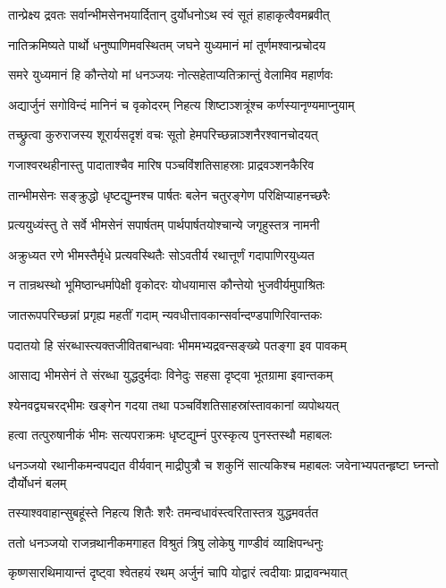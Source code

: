 \twolineshloka
{तान्प्रेक्ष्य द्रवतः सर्वान्भीमसेनभयार्दितान्}
{दुर्योधनोऽथ स्वं सूतं हाहाकृत्वैवमब्रवीत्}


\twolineshloka
{नातिक्रमिष्यते पार्थो धनुष्पाणिमवस्थितम्}
{जघने युध्यमानं मां तूर्णमश्वान्प्रचोदय}


\twolineshloka
{समरे युध्यमानं हि कौन्तेयो मां धनञ्जयः}
{नोत्सहेताप्यतिक्रान्तुं वेलामिव महार्णवः}


\twolineshloka
{अद्यार्जुनं सगोविन्दं मानिनं च वृकोदरम्}
{निहत्य शिष्टाञ्शत्रूंश्च कर्णस्यानृण्यमाप्नुयाम्}


\twolineshloka
{तच्छ्रुत्वा कुरुराजस्य शूरार्यसदृशं वचः}
{सूतो हेमपरिच्छन्नाञ्शनैरश्वानचोदयत्}


\twolineshloka
{गजाश्वरथहीनास्तु पादाताश्चैव मारिष}
{पञ्चविंशतिसाहस्राः प्राद्रवञ्शनकैरिव}


\twolineshloka
{तान्भीमसेनः सङ्क्रुद्धो धृष्टद्युम्नश्च पार्षतः}
{बलेन चतुरङ्गेण परिक्षिप्याहनच्छरैः}


\twolineshloka
{प्रत्ययुध्यंस्तु ते सर्वे भीमसेनं सपार्षतम्}
{पार्थपार्षतयोश्चान्ये जगृहुस्तत्र नामनी}


\twolineshloka
{अक्रुध्यत रणे भीमस्तैर्मृधे प्रत्यवस्थितैः}
{सोऽवतीर्य रथात्तूर्णं गदापाणिरयुध्यत}


\twolineshloka
{न तान्रथस्थो भूमिष्ठान्धर्मापेक्षी वृकोदरः}
{योधयामास कौन्तेयो भुजवीर्यमुपाश्रितः}


\twolineshloka
{जातरूपपरिच्छन्नां प्रगृह्य महतीं गदाम्}
{न्यवधीत्तावकान्सर्वान्दण्डपाणिरिवान्तकः}


\twolineshloka
{पदातयो हि संरब्धास्त्यक्तजीवितबान्धवाः}
{भीममभ्यद्रवन्सङ्ख्ये पतङ्गा इव पावकम्}


\twolineshloka
{आसाद्य भीमसेनं ते संरब्धा युद्धदुर्मदाः}
{विनेदुः सहसा दृष्ट्वा भूतग्रामा इवान्तकम्}


\twolineshloka
{श्येनवद्व्यचरद्भीमः खङ्गेन गदया तथा}
{पञ्चविंशतिसाहस्रांस्तावकानां व्यपोथयत्}


\twolineshloka
{हत्वा तत्पुरुषानीकं भीमः सत्यपराक्रमः}
{धृष्टद्युम्नं पुरस्कृत्य पुनस्तस्थौ महाबलः}


धनञ्जयो रथानीकमन्वपद्यत वीर्यवान्
\twolineshloka
{माद्रीपुत्रौ च शकुनिं सात्यकिश्च महाबलः}
{जवेनाभ्यपतन्हृष्टा घ्नन्तो दौर्योधनं बलम्}


\twolineshloka
{तस्याश्ववाहान्सुबहूंस्ते निहत्य शितैः शरैः}
{तमन्वधावंस्त्वरितास्तत्र युद्धमवर्तत}


\twolineshloka
{ततो धनञ्जयो राजन्रथानीकमगाहत}
{विश्रुतं त्रिषु लोकेषु गाण्डीवं व्याक्षिपन्धनुः}


\twolineshloka
{कृष्णसारथिमायान्तं दृष्ट्वा श्वेतहयं रथम्}
{अर्जुनं चापि योद्वारं त्वदीयाः प्राद्रावन्भयात्}


